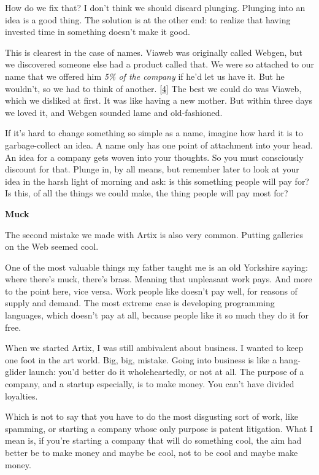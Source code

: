 How do we fix that? I don't think we should discard plunging. Plunging
into an idea is a good thing. The solution is at the other end: to
realize that having invested time in something doesn't make it good.

This is clearest in the case of names. Viaweb was originally called
Webgen, but we discovered someone else had a product called that. We
were so attached to our name that we offered him \emph{5\% of the
company} if he'd let us have it. But he wouldn't, so we had to think of
another. {[}\hyperref[f4n]{4}{]} The best we could do was Viaweb, which
we disliked at first. It was like having a new mother. But within three
days we loved it, and Webgen sounded lame and old-fashioned.

If it's hard to change something so simple as a name, imagine how hard
it is to garbage-collect an idea. A name only has one point of
attachment into your head. An idea for a company gets woven into your
thoughts. So you must consciously discount for that. Plunge in, by all
means, but remember later to look at your idea in the harsh light of
morning and ask: is this something people will pay for? Is this, of all
the things we could make, the thing people will pay most for?

\textbf{Muck}

The second mistake we made with Artix is also very common. Putting
galleries on the Web seemed cool.

One of the most valuable things my father taught me is an old Yorkshire
saying: where there's muck, there's brass. Meaning that unpleasant work
pays. And more to the point here, vice versa. Work people like doesn't
pay well, for reasons of supply and demand. The most extreme case is
developing programming languages, which doesn't pay at all, because
people like it so much they do it for free.

When we started Artix, I was still ambivalent about business. I wanted
to keep one foot in the art world. Big, big, mistake. Going into
business is like a hang-glider launch: you'd better do it
wholeheartedly, or not at all. The purpose of a company, and a startup
especially, is to make money. You can't have divided loyalties.

Which is not to say that you have to do the most disgusting sort of
work, like spamming, or starting a company whose only purpose is patent
litigation. What I mean is, if you're starting a company that will do
something cool, the aim had better be to make money and maybe be cool,
not to be cool and maybe make money.

